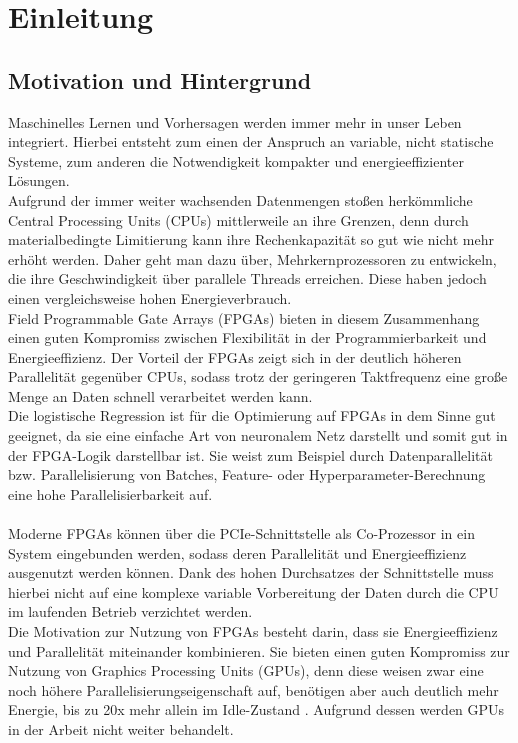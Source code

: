 \chapter{Einleitung}
\section{Motivation und Hintergrund}
Maschinelles Lernen und Vorhersagen werden immer mehr in unser Leben integriert. Hierbei entsteht zum einen der Anspruch an variable, nicht statische Systeme, zum anderen die Notwendigkeit kompakter und energieeffizienter Lösungen.\\
Aufgrund der immer weiter wachsenden Datenmengen stoßen herkömmliche Central Processing Units (CPUs) mittlerweile an ihre Grenzen, denn durch materialbedingte Limitierung kann ihre Rechenkapazität so gut wie nicht mehr erhöht werden. Daher geht man dazu über, Mehrkernprozessoren zu entwickeln, die ihre Geschwindigkeit über parallele Threads erreichen. Diese haben jedoch einen vergleichsweise hohen Energieverbrauch.\\
Field Programmable Gate Arrays (FPGAs) bieten in diesem Zusammenhang einen guten Kompromiss zwischen Flexibilität in der Programmierbarkeit und Energieeffizienz. Der Vorteil der FPGAs zeigt sich in der deutlich höheren Parallelität gegenüber CPUs, sodass trotz der geringeren Taktfrequenz eine große Menge an Daten schnell verarbeitet werden kann.\\
Die logistische Regression ist für die Optimierung auf FPGAs in dem Sinne gut geeignet, da sie eine einfache Art von neuronalem Netz darstellt und somit gut in der FPGA-Logik darstellbar ist. Sie weist zum Beispiel durch Datenparallelität bzw. Parallelisierung von Batches, Feature- oder Hyperparameter-Berechnung eine hohe Parallelisierbarkeit auf.\\\\
Moderne FPGAs können über die PCIe-Schnittstelle als Co-Prozessor in ein System eingebunden werden, sodass deren Parallelität und Energieeffizienz ausgenutzt werden können. Dank des hohen Durchsatzes der Schnittstelle muss hierbei nicht auf eine komplexe variable Vorbereitung der Daten durch die CPU im laufenden Betrieb verzichtet werden.\\
Die Motivation zur Nutzung von FPGAs besteht darin, dass sie Energieeffizienz und Parallelität miteinander kombinieren. Sie bieten einen guten Kompromiss zur Nutzung von Graphics Processing Units (GPUs), denn diese weisen zwar eine noch höhere Parallelisierungseigenschaft auf, benötigen aber auch deutlich mehr Energie, bis zu 20x mehr allein im Idle-Zustand \cite{GPU}. Aufgrund dessen werden GPUs in der Arbeit nicht weiter behandelt.


